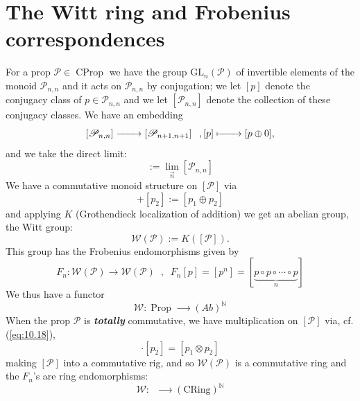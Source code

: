 \documentclass[leqno]{article}
\newcommand{\gl}{\text{GL}}
\newcommand{\myemph}[1]{{\it{\bf{#1}}}}
\newcommand{\cring}{\text{CRing}}
\newcommand{\N}{\mathbb{N}}
\newcommand{\biop}{\mathscr{P}}
\DeclareMathOperator{\ctprop}{C_TProp}
\DeclareMathOperator{\prop}{Prop}
\DeclareMathOperator{\cprop}{CProp}
\numberwithin{equation}{section}
\begin{document}
\section{The Witt ring and Frobenius correspondences}
For a prop $\biop\in \cprop$ we have the group $\gl_{n}(\biop)$ of invertible elements of
the monoid $\biop_{n,n}$ and it acts on $\biop_{n,n}$ by conjugation; we let $[p]$ denote
the conjugacy class of $p\in\biop_{n,n}$ and we let $[\biop_{n,n}]$ denote the collection
of these conjugacy classes. We have an embedding
\begin{equation}
				\left[ \biop_{n,n} \right]\xrightarrow{\qquad} \left[ \biop_{n+1,n+1} \right]\;\;
				, [p]\xmapsto{\qquad}[p\oplus 0], 
				\label{eq:12.1}
\end{equation}
and we take the direct limit:
\begin{equation}
				[\biop]:=\lim\limits_{\overset{\rightarrow}{n}}\left[ \biop_{n,n} \right]
				\label{eq:12.2}
\end{equation}
We have a commutative monoid structure on $[\biop]$ via 
\begin{equation}
				[p_1]+[p_2] := \left[ p_1\oplus p_2 \right]
				\label{eq:12.3}
\end{equation}
and applying $K$ (Grothendieck localization of addition) we get an abelian group, the Witt group:
\begin{equation}
				\mathcal{W}(\biop):=K \left( [\biop] \right). 
				\label{eq:12.4}
\end{equation}
This group has the Frobenius endomorphisms given by 
\begin{equation}
				F_n:\mathcal{W}(\biop)\rightarrow \mathcal{W}(\biop)\;\;, \;\; F_n[p]=[p^n]=
				\left[ \underbrace{p\circ p\circ \cdots\circ p}_{n} \right]
				\label{eq:12.5}
\end{equation}
We thus have a functor 
\begin{equation}
				\mathcal{W}: \prop\xrightarrow{\qquad} (Ab)^{\N}
				\label{eq:12.6}
\end{equation}
When the prop $\biop$ is \myemph{totally} commutative, we have multiplication on $[\biop]$ via, cf.
(\ref{eq:10.18}), 
\begin{equation}
				[p_1]\cdot [p_2]= [p_1\otimes p_2]
				\label{eq:12.7}
\end{equation}
making $[\biop]$ into a commutative rig, and so $\mathcal{W}(\biop)$ is a commutative ring
and the $F_n$'s are ring endomorphisms: 
\begin{equation}
				\mathcal{W}:\ctprop\xrightarrow{\qquad}(\cring)^{\N}
				\label{eq:12.8}
\end{equation}
\end{document}

